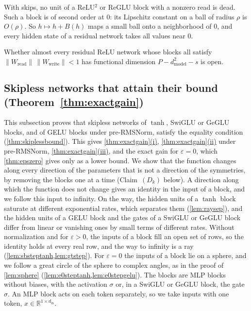 \documentclass[10pt]{article}
\theoremstyle{definition}
\theoremstyle{remark}
\newcommand{\R}{\mathbb{R}}
\newcommand{\Wread}{W_{\mathrm{read}}}
\newcommand{\Wwrite}{W_{\mathrm{write}}}
\newcommand{\dm}{d_{\mathrm{model}}}
\newcommand{\norm}[1]{\lVert #1\rVert}
\DeclareRobustCommand{\cpref}[2]{\hyperref[#1:#2]{\cref*{#1}(#2)}}
\begin{document}
With skips, no unit of a ReLU$^2$ or ReGLU block with a nonzero read is dead. Such a block is of second order at $0$: its Lipschitz constant on a ball of radius $\rho$ is $O(\rho)$. So $h \mapsto h + B(h)$ maps a small ball onto a neighborhood of $0$, and every hidden state of a residual network takes all values near $0$.

Whether almost every residual ReLU network whose blocks all satisfy $\norm{\Wread}\,\norm{\Wwrite} < 1$ has functional dimension $P - \dm^2 - s$ is open.


\subsection{Skipless networks that attain their bound\texorpdfstring{ (Theorem~\ref*{thm:exactgain})}{}}\label{app:rmsskipless}\label{app:epszeroskipless}\label{app:skiplessbound}

This subsection proves that skipless networks of $\tanh$, SwiGLU or GeGLU blocks, and of GELU blocks under pre-RMSNorm, satisfy the equality condition (\cref{thm:skiplessbound}). This gives \cpref{thm:exactgain}{i}, \cpref{thm:exactgain}{ii} under pre-RMSNorm, \cpref{thm:exactgain}{iii}, and the exact gain for $\varepsilon = 0$, which \cref{thm:epszero} gives only as a lower bound. We show that the function changes along every direction of the parameters that is not a direction of the symmetries, by removing the blocks one at a time (Claim~$(D_k)$ below). A direction along which the function does not change gives an identity in the input of a block, and we follow this input to infinity. On the way, the hidden units of a $\tanh$ block saturate at different exponential rates, which separates them (\cref{lem:raysep}), and the hidden units of a GELU block and the gates of a SwiGLU or GeGLU block differ from linear or vanishing ones by small terms of different rates. Without normalization and for $\varepsilon > 0$, the inputs of a block fill an open set of rows, so the identity holds at every real row, and the way to infinity is a ray (\cref{lem:sbsteptanh,lem:gtstep}). For $\varepsilon = 0$ the inputs of a block lie on a sphere, and we follow a great circle of the sphere to complex angles, as in the proof of \cref{lem:sphere} (\cref{lem:e0steptanh,lem:e0stepgelu}). The blocks are MLP blocks without biases, with the activation $\sigma$ or, in a SwiGLU or GeGLU block, the gate $\sigma$. An MLP block acts on each token separately, so we take inputs with one token, $x \in \R^{1\times d_{\mathrm{in}}}$.
\end{document}

